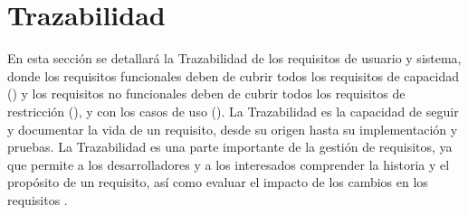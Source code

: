 \FloatBarrier

\section{Trazabilidad}\label{sec:trazabilidad}

En esta sección se detallará la Trazabilidad de los requisitos de usuario y sistema, donde los requisitos funcionales deben de cubrir todos los requisitos de capacidad () y los requisitos no funcionales deben de cubrir todos los requisitos de restricción (), y con los casos de uso (). La Trazabilidad es la capacidad de seguir y documentar la vida de un requisito, desde su origen hasta su implementación y pruebas. La Trazabilidad es una parte importante de la gestión de requisitos, ya que permite a los desarrolladores y a los interesados comprender la historia y el propósito de un requisito, así como evaluar el impacto de los cambios en los requisitos \cite{IEEE-Requirements}.

\begin{table}[htb]
      {\traceabilityFNCA}
  \end{table}

\begin{table}[htb]
      {\traceabilityNFRE}
  \end{table}

